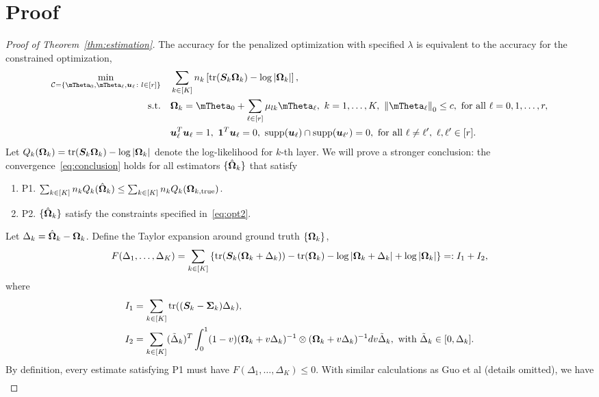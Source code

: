 \documentclass[11pt]{article}
\theoremstyle{plain}
\theoremstyle{definition}
\begin{document}
\section{Proof}
\begin{proof}[Proof of Theorem~\ref{thm:estimation}] The accuracy for the penalized optimization with specified $\lambda$ is equivalent to the accuracy for the constrained optimization,
\begin{align}\label{eq:opt2}
\min_{\tC=\{\mTheta_0, \mTheta_\ell,\bmu_\ell\colon l\in[r]\}}\quad &\sum_{k\in[K]}n_k \left[\text{tr}(\mS_k\mOmega_k)-\log|\mOmega_k|\right],\notag \\
\text{s.t.}\quad & \mOmega_k=\mTheta_0+\sum_{\ell\in[r]}\mu_{lk}\mTheta_\ell,\ k=1,\ldots,K,\ \zeronorm{\mTheta_\ell}\leq c, \ \text{for all }\ell=0,1,\ldots,r,\notag\\
& \bmu^T_\ell\bmu_\ell=1,\ \mathbf{1}^T\bmu_\ell=0,\ \text{supp}(\bmu_\ell)\cap \text{supp}(\bmu_{\ell'})=0,\ \text{for all }\ell\neq \ell',\ \ell,\ell'\in[r].
\end{align}
Let $Q_k(\bm \Omega_k)=\text{tr}(\bm S_k\bm \Omega_k)-\log|\bm \Omega_k|$ denote the log-likelihood for $k$-th layer. We will prove a stronger conclusion: the convergence~\eqref{eq:conclusion} holds for all estimators $\{\hat {\bm \Omega}_k\}$ that satisfy 
\begin{enumerate}
\item P1. $\sum_{k\in[K]}n_kQ_k(\hat {\bm \Omega}_k)\leq \sum_{k\in[K]}n_kQ_k(\bm \Omega_{k,\text{true}})$. 
\item P2. $\{\hat {\bm \Omega}_k\}$ satisfy the constraints specified in~\eqref{eq:opt2}. 
\end{enumerate}
Let $\Delta_k=\hat {\bm \Omega}_k-\bm \Omega_k$. Define the Taylor expansion around ground truth $\{\bm \Omega_k\}$, 
\[
F(\Delta_1,\ldots,\Delta_K)=\sum_{k\in[K]}\left\{\text{tr}(\bm S_k(\bm \Omega_k+\Delta_k))-\text{tr}(\bm \Omega_k)-\log|\bm \Omega_k+\Delta_k|+\log|\bm \Omega_k|\right\}=:I_1+I_2,
\]
where 
\begin{align}
I_1&=\sum_{k\in[K]}\text{tr}((\bm S_k-\bm \Sigma_k)\Delta_k),\notag\\
I_2&=\sum_{k\in[K]}(\tilde \Delta_k)^T\int_{0}^1(1-v)(\bm \Omega_k+v\Delta_k)^{-1}\otimes(\bm \Omega_k+v\Delta_k)^{-1}dv\tilde \Delta_k, \ \text{with }\tilde \Delta_k  \in [0,\Delta_k].
\end{align}
By definition, every estimate satisfying P1 must have $F(\Delta_1,\ldots,\Delta_K)\leq 0$. 
With similar calculations as Guo et al (details omitted), we have
\begin{align}\label{eq:1}

\end{align}
\end{proof}
\end{document}
